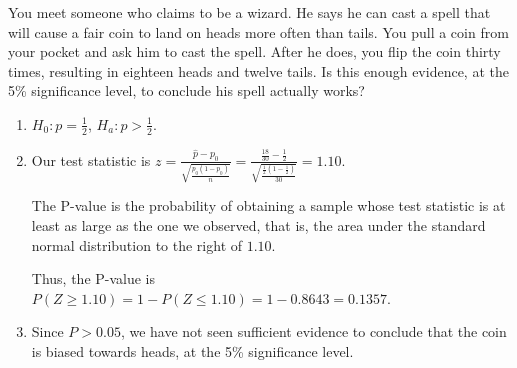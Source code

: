 \begin{example}
You meet someone who claims to be a wizard. He says he can cast a spell that will cause a fair coin to land on heads more often than tails. You pull a coin from your pocket and ask him to cast the spell. After he does, you flip the coin thirty times, resulting in eighteen heads and twelve tails. Is this enough evidence, at the 5\% significance level, to conclude his spell actually works?

\begin{enumerate}[label=\textnormal{\Roman*}.]
\item $H_0: p = \frac{1}{2}$, $H_a: p > \frac{1}{2}$.

\item Our test statistic is $z = \frac{\widehat{p} - p_0}{\sqrt{\frac{p_0(1-p_0)}{n}}} = \frac{\frac{18}{30} - \frac{1}{2}}{\sqrt{\frac{\frac{1}{2}(1-\frac{1}{2})}{30}}} = 1.10$.

The P-value is the probability of obtaining a sample whose test statistic is at least as large as the one we observed, that is, the area under the standard normal distribution to the right of $1.10$.
\begin{center}
\end{center}
Thus, the P-value is $P(Z \geq 1.10) = 1 - P(Z \leq 1.10) = 1 - 0.8643 = 0.1357$.

\item Since $P > 0.05$, we have not seen sufficient evidence to conclude that the coin is biased towards heads, at the 5\% significance level.
\end{enumerate}
\end{example}

